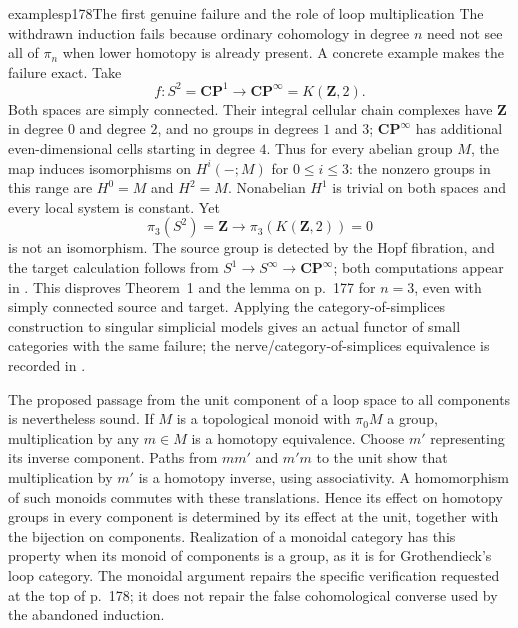 \begin{dcomment}{examples}{p178}{The first genuine failure and the role of loop multiplication}
The withdrawn induction fails because ordinary cohomology in degree $n$ need not see all of $\pi_n$ when lower homotopy is already present. A concrete example makes the failure exact. Take
\[
 f:S^2=\mathbf{CP}^{1}\longrightarrow\mathbf{CP}^{\infty}=K(\mathbf Z,2).
\]
Both spaces are simply connected. Their integral cellular chain complexes have $\mathbf Z$ in degree $0$ and degree $2$, and no groups in degrees $1$ and $3$; $\mathbf{CP}^{\infty}$ has additional even-dimensional cells starting in degree $4$. Thus for every abelian group $M$, the map induces isomorphisms on $H^i(-;M)$ for $0\leq i\leq3$: the nonzero groups in this range are $H^0=M$ and $H^2=M$. Nonabelian $H^1$ is trivial on both spaces and every local system is constant. Yet
\[
 \pi_3(S^2)=\mathbf Z\longrightarrow
 \pi_3(K(\mathbf Z,2))=0
\]
is not an isomorphism. The source group is detected by the Hopf fibration, and the target calculation follows from $S^1\to S^\infty\to\mathbf{CP}^{\infty}$; both computations appear in \citet[Examples~4.50--4.51]{Hatcher2002}. This disproves Theorem~1 and the lemma on p.~177 for $n=3$, even with simply connected source and target. Applying the category-of-simplices construction to singular simplicial models gives an actual functor of small categories with the same failure; the nerve/category-of-simplices equivalence is recorded in \citet[Lemma~2.1.15]{Cisinski2004Minimal}.

The proposed passage from the unit component of a loop space to all components is nevertheless sound. If $M$ is a topological monoid with $\pi_0M$ a group, multiplication by any $m\in M$ is a homotopy equivalence. Choose $m'$ representing its inverse component. Paths from $mm'$ and $m'm$ to the unit show that multiplication by $m'$ is a homotopy inverse, using associativity. A homomorphism of such monoids commutes with these translations. Hence its effect on homotopy groups in every component is determined by its effect at the unit, together with the bijection on components. Realization of a monoidal category has this property when its monoid of components is a group, as it is for Grothendieck's loop category. The monoidal argument repairs the specific verification requested at the top of p.~178; it does not repair the false cohomological converse used by the abandoned induction.
\end{dcomment}


